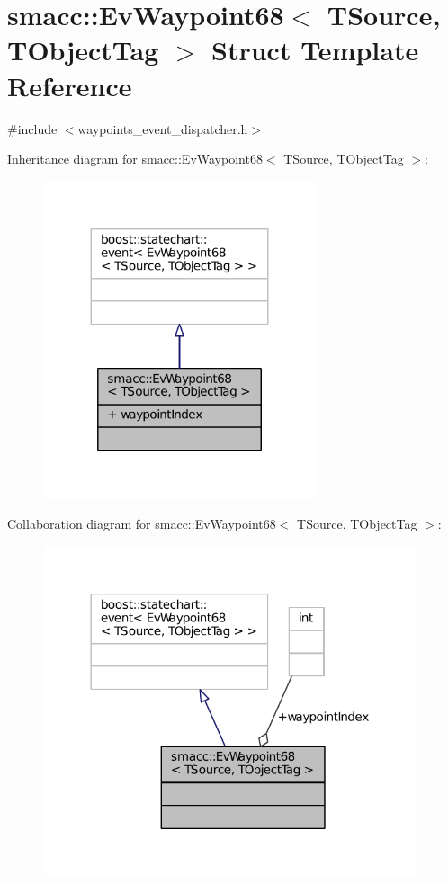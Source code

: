 \hypertarget{structsmacc_1_1EvWaypoint68}{}\section{smacc\+:\+:Ev\+Waypoint68$<$ T\+Source, T\+Object\+Tag $>$ Struct Template Reference}
\label{structsmacc_1_1EvWaypoint68}


{\ttfamily \#include $<$waypoints\+\_\+event\+\_\+dispatcher.\+h$>$}



Inheritance diagram for smacc\+:\+:Ev\+Waypoint68$<$ T\+Source, T\+Object\+Tag $>$\+:
\nopagebreak
\begin{figure}[H]
\begin{center}
\leavevmode
\includegraphics[width=227pt]{structsmacc_1_1EvWaypoint68__inherit__graph}
\end{center}
\end{figure}


Collaboration diagram for smacc\+:\+:Ev\+Waypoint68$<$ T\+Source, T\+Object\+Tag $>$\+:
\nopagebreak
\begin{figure}[H]
\begin{center}
\leavevmode
\includegraphics[width=312pt]{structsmacc_1_1EvWaypoint68__coll__graph}
\end{center}
\end{figure}
